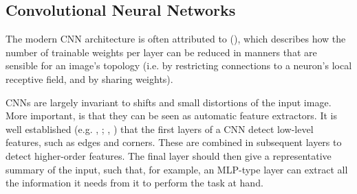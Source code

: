 \subsection{Convolutional Neural Networks} \label{intro:cnns}
The modern CNN architecture is often attributed to \citeauthor{lecun1998gradient} (\citeyear{lecun1998gradient}), which describes how the number of trainable weights per layer can be reduced in manners that are sensible for an image's topology (i.e. by restricting connections to a neuron's local receptive field, and by sharing weights).


CNNs are largely invariant to shifts and small distortions of the input image. More important, is that they can be seen as automatic feature extractors. It is well established (e.g. \citeauthor{lecun1998gradient}, \citeyear{lecun1998gradient}; \citeauthor{yosinski2014transferable}, \citeyear{yosinski2014transferable}) that the first layers of a CNN detect low-level features, such as edges and corners. These are combined in subsequent layers to detect higher-order features. The final layer should then give a representative summary of the input, such that, for example, an MLP-type layer can extract all the information it needs from it to perform the task at hand.



